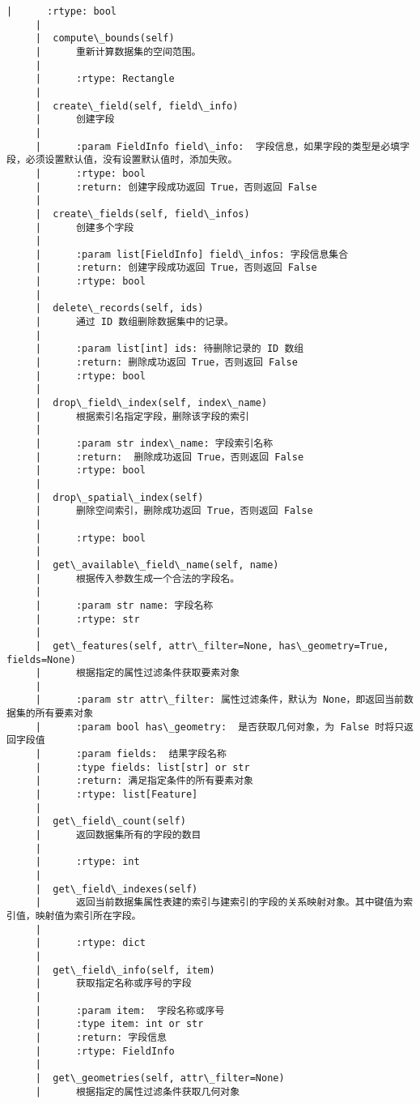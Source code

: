\documentclass[11pt]{article}
\begin{document}
\begin{Verbatim}[commandchars=\\\{\}]
     |      :rtype: bool
     |  
     |  compute\_bounds(self)
     |      重新计算数据集的空间范围。
     |      
     |      :rtype: Rectangle
     |  
     |  create\_field(self, field\_info)
     |      创建字段
     |      
     |      :param FieldInfo field\_info:  字段信息，如果字段的类型是必填字段，必须设置默认值，没有设置默认值时，添加失败。
     |      :rtype: bool
     |      :return: 创建字段成功返回 True，否则返回 False
     |  
     |  create\_fields(self, field\_infos)
     |      创建多个字段
     |      
     |      :param list[FieldInfo] field\_infos: 字段信息集合
     |      :return: 创建字段成功返回 True，否则返回 False
     |      :rtype: bool
     |  
     |  delete\_records(self, ids)
     |      通过 ID 数组删除数据集中的记录。
     |      
     |      :param list[int] ids: 待删除记录的 ID 数组
     |      :return: 删除成功返回 True，否则返回 False
     |      :rtype: bool
     |  
     |  drop\_field\_index(self, index\_name)
     |      根据索引名指定字段，删除该字段的索引
     |      
     |      :param str index\_name: 字段索引名称
     |      :return:  删除成功返回 True，否则返回 False
     |      :rtype: bool
     |  
     |  drop\_spatial\_index(self)
     |      删除空间索引，删除成功返回 True，否则返回 False
     |      
     |      :rtype: bool
     |  
     |  get\_available\_field\_name(self, name)
     |      根据传入参数生成一个合法的字段名。
     |      
     |      :param str name: 字段名称
     |      :rtype: str
     |  
     |  get\_features(self, attr\_filter=None, has\_geometry=True, fields=None)
     |      根据指定的属性过滤条件获取要素对象
     |      
     |      :param str attr\_filter: 属性过滤条件，默认为 None，即返回当前数据集的所有要素对象
     |      :param bool has\_geometry:  是否获取几何对象，为 False 时将只返回字段值
     |      :param fields:  结果字段名称
     |      :type fields: list[str] or str
     |      :return: 满足指定条件的所有要素对象
     |      :rtype: list[Feature]
     |  
     |  get\_field\_count(self)
     |      返回数据集所有的字段的数目
     |      
     |      :rtype: int
     |  
     |  get\_field\_indexes(self)
     |      返回当前数据集属性表建的索引与建索引的字段的关系映射对象。其中键值为索引值，映射值为索引所在字段。
     |      
     |      :rtype: dict
     |  
     |  get\_field\_info(self, item)
     |      获取指定名称或序号的字段
     |      
     |      :param item:  字段名称或序号
     |      :type item: int or str
     |      :return: 字段信息
     |      :rtype: FieldInfo
     |  
     |  get\_geometries(self, attr\_filter=None)
     |      根据指定的属性过滤条件获取几何对象

\end{Verbatim}
\end{document}
